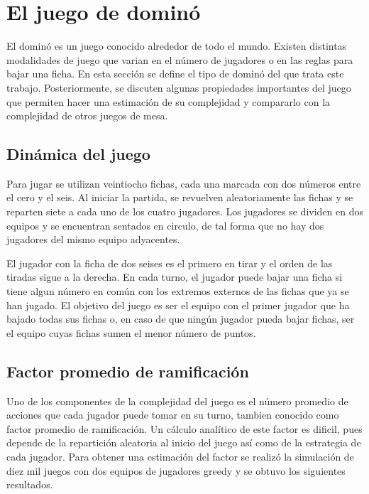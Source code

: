 \chapter{El juego de dominó}

\noindent

El dominó es un juego conocido alrededor de todo el mundo. Existen distintas 
modalidades de juego que varian en el número de jugadores o en las reglas para bajar una ficha.
En esta sección se define el tipo de dominó del que trata este trabajo. 
Posteriormente, se discuten algunas propiedades importantes del juego que permiten hacer 
una estimación de su complejidad y compararlo con la complejidad de otros juegos de 
mesa.

\newpage

\section{Dinámica del juego}

Para jugar se utilizan veintiocho fichas, cada una marcada con dos números entre el 
cero y el seis. Al iniciar la partida, se revuelven aleatoriamente las fichas y se reparten siete 
a cada uno de los cuatro jugadores. Los jugadores se dividen en dos equipos y se 
encuentran sentados en circulo, de tal forma que no hay dos jugadores del mismo equipo 
adyacentes.

El jugador con la ficha de dos seises es el primero en tirar y el orden de las tiradas sigue a 
la derecha. En cada turno, el jugador puede bajar una ficha si tiene algun número en común 
con los extremos externos de las fichas que ya se han jugado. El objetivo del juego es ser el 
equipo con el primer jugador que ha bajado todas sus fichas o, en caso de que ningún 
jugador pueda bajar fichas, ser el equipo cuyas fichas sumen el menor número de puntos. 

\section{Factor promedio de ramificación}

Uno de los componentes de la complejidad del juego es el número promedio de acciones que cada 
jugador puede tomar en su turno, tambien conocido como factor promedio de ramificación. 
Un cálculo analítico de este factor es dificil, pues depende de la repartición aleatoria al 
inicio del juego así como de la estrategia de cada jugador. Para obtener una estimación del 
factor se realizó la simulación de diez mil juegos con dos equipos de jugadores greedy y se 
obtuvo los siguientes resultados.


